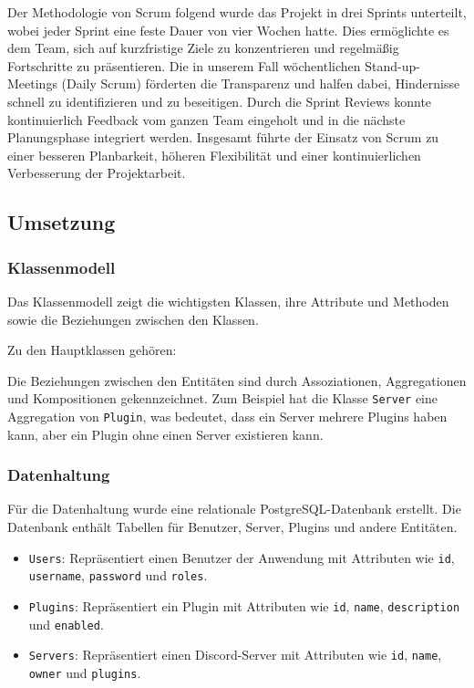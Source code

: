Der Methodologie von Scrum folgend wurde das Projekt in drei Sprints unterteilt, wobei jeder Sprint eine feste Dauer von vier Wochen hatte. Dies ermöglichte es dem Team, sich auf kurzfristige Ziele zu konzentrieren und regelmäßig Fortschritte zu präsentieren. Die in unserem Fall wöchentlichen Stand-up-Meetings (Daily Scrum) förderten die Transparenz und halfen dabei, Hindernisse schnell zu identifizieren und zu beseitigen. Durch die Sprint Reviews konnte kontinuierlich Feedback vom ganzen Team eingeholt und in die nächste Planungsphase integriert werden. Insgesamt führte der Einsatz von Scrum zu einer besseren Planbarkeit, höheren Flexibilität und einer kontinuierlichen Verbesserung der Projektarbeit.

\subsection{Umsetzung}\label{umsetzung}

\subsubsection{Klassenmodell}\label{klassenmodell}

Das Klassenmodell zeigt die wichtigsten Klassen, ihre
Attribute und Methoden sowie die Beziehungen zwischen den Klassen.

Zu den Hauptklassen gehören:





Die Beziehungen zwischen den Entitäten sind durch Assoziationen,
Aggregationen und Kompositionen gekennzeichnet. Zum Beispiel hat die
Klasse \texttt{Server} eine Aggregation von \texttt{Plugin}, was
bedeutet, dass ein Server mehrere Plugins haben kann, aber ein Plugin
ohne einen Server existieren kann.

\subsubsection{Datenhaltung}\label{datenhaltung}

Für die Datenhaltung wurde eine relationale Post\-greSQL-Datenbank erstellt. Die Datenbank enthält Tabellen für Benutzer, Server, Plugins und andere Entitäten.

\begin{itemize}
  \item
    \texttt{Users}: Repräsentiert einen Benutzer der Anwendung mit
    Attributen wie \texttt{id}, \texttt{username}, \texttt{password} und
    \texttt{roles}.
  \item
    \texttt{Plugins}: Repräsentiert ein Plugin mit Attributen wie
    \texttt{id}, \texttt{name}, \texttt{description} und \texttt{enabled}.
  \item
    \texttt{Servers}: Repräsentiert einen Discord-Server mit Attributen wie
    \texttt{id}, \texttt{name}, \texttt{owner} und \texttt{plugins}.
  \end{itemize}
  
